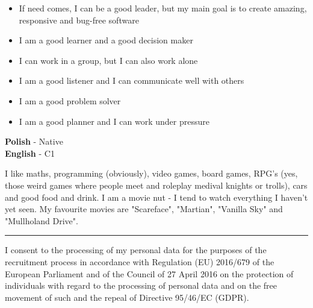 \documentclass[9pt]{developercv}%
\begin{document}
\begin{itemize}
	\item If need comes, I can be a good leader, but my main goal is to create amazing, responsive and bug-free software
	\item I am a good learner and a good decision maker
	\item I can work in a group, but I can also work alone
	\item I am a good listener and I can communicate well with others
	\item I am a good problem solver
	\item I am a good planner and I can work under pressure
\end{itemize}
\vspace{0.5cm}

\begin{minipage}[t]{0.3\textwidth}
	\vspace{-\baselineskip} %


	\textbf{Polish} - Native \\
	\textbf{English} - C1
\end{minipage}
\hfill
\begin{minipage}[t]{0.7\textwidth}
	\vspace{-\baselineskip} %


	I like maths, programming (obviously), video games, board games, RPG's (yes, those weird games where people meet and roleplay medival knights or trolls), cars and good food and drink. I am a movie nut - I tend to watch everything I haven't yet seen. My favourite movies are "Scareface", "Martian", "Vanilla Sky" and "Mullholand Drive".
\end{minipage}
\vspace{1.5cm}

\noindent\rule{8cm}{0.4pt}

I consent to the processing of my personal data for the purposes of the recruitment process in accordance with Regulation (EU) 2016/679 of the European Parliament and of the Council of 27 April 2016 on the protection of individuals with regard to the processing of personal data and on the free movement of such and the repeal of Directive 95/46/EC (GDPR).
\end{document}
